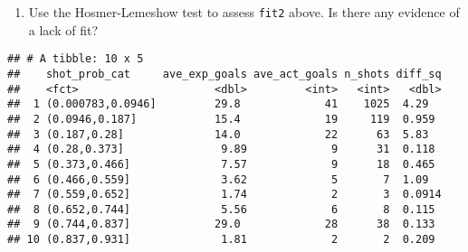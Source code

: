 \documentclass[]{article}
\newenvironment{Shaded}{\begin{snugshade}}{\end{snugshade}}
\newcommand{\DataTypeTok}[1]{\textcolor[rgb]{0.13,0.29,0.53}{#1}}
\newcommand{\DecValTok}[1]{\textcolor[rgb]{0.00,0.00,0.81}{#1}}
\newcommand{\KeywordTok}[1]{\textcolor[rgb]{0.13,0.29,0.53}{\textbf{#1}}}
\newcommand{\NormalTok}[1]{#1}
\newcommand{\OperatorTok}[1]{\textcolor[rgb]{0.81,0.36,0.00}{\textbf{#1}}}
\newcommand{\StringTok}[1]{\textcolor[rgb]{0.31,0.60,0.02}{#1}}
\providecommand{\tightlist}{%
  \setlength{\itemsep}{0pt}\setlength{\parskip}{0pt}}
\begin{document}
\begin{enumerate}
\def\labelenumi{\arabic{enumi}.}
\setcounter{enumi}{4}
\tightlist
\item
  Use the Hosmer-Lemeshow test to assess \texttt{fit2} above. Is there
  any evidence of a lack of fit?
\end{enumerate}

\begin{Shaded}
\end{Shaded}

\begin{verbatim}
## # A tibble: 10 x 5
##    shot_prob_cat     ave_exp_goals ave_act_goals n_shots diff_sq
##    <fct>                     <dbl>         <int>   <int>   <dbl>
##  1 (0.000783,0.0946]         29.8             41    1025  4.29  
##  2 (0.0946,0.187]            15.4             19     119  0.959 
##  3 (0.187,0.28]              14.0             22      63  5.83  
##  4 (0.28,0.373]               9.89             9      31  0.118 
##  5 (0.373,0.466]              7.57             9      18  0.465 
##  6 (0.466,0.559]              3.62             5       7  1.09  
##  7 (0.559,0.652]              1.74             2       3  0.0914
##  8 (0.652,0.744]              5.56             6       8  0.115 
##  9 (0.744,0.837]             29.0             28      38  0.133 
## 10 (0.837,0.931]              1.81             2       2  0.209
\end{verbatim}
\end{document}
